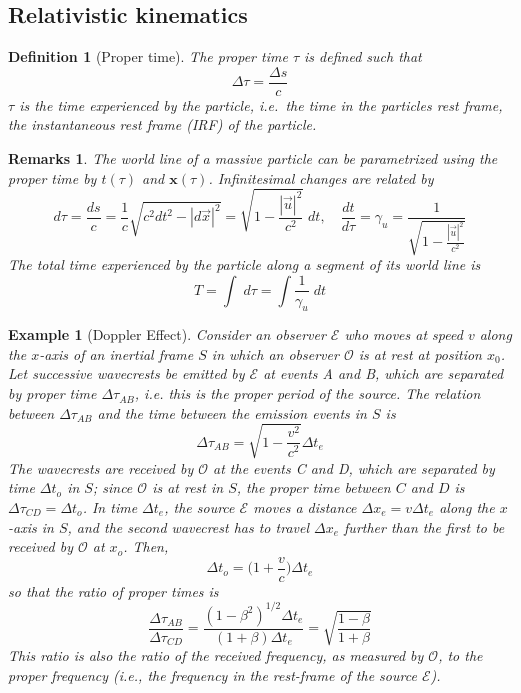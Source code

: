 \documentclass[a4paper]{article}
\newtheorem{eg}{Example}[section]
\newtheorem{remarks}{Remarks}[section]
\theoremstyle{new}
\newtheorem{defi}{Definition}[section]
\begin{document}
\subsection{Relativistic kinematics}
\begin{defi}[Proper time]
  The proper time $\tau$ is defined such that
$$\Delta \tau = \frac{\Delta s}{c}$$
  $\tau$ is the time experienced by the particle, i.e.\ the time in the particles rest frame, the instantaneous rest frame (IRF) of the particle.
\end{defi}
\begin{remarks}
The world line of a massive particle can be parametrized using the proper time by $t(\tau)$ and $\mathbf{x}(\tau)$. Infinitesimal changes are related by
\begin{equation}
d \tau = \frac{d s}{c} = \frac{1}{c}\sqrt{c^2dt^2 - |d \vec{x}|^2} = \sqrt{1 - \frac{|\vec{u}|^2}{c^2}}\;d t,\quad\frac{d t}{d \tau} = \gamma_u= \frac{1}{\sqrt{1 - \frac{|\vec{u}|^2}{c^2}}}\label{propertime}
\end{equation}
The total time experienced by the particle along a segment of its world line is
$$T = \int \;d \tau = \int\frac{1}{\gamma_u}\;d t$$
\end{remarks}
\begin{eg}[Doppler Effect]
Consider an observer $\mathcal{E}$ who moves at speed $v$ along the $x$-axis of an inertial frame $S$ in which an observer $\mathcal{O}$ is at rest at position $x_0$. Let successive wavecrests be emitted by $\mathcal{E}$ at events A and B, which are separated by proper time $\Delta\tau_{AB}$, i.e. this is the proper period of the source. The relation between $\Delta\tau_{AB}$ and the time between the emission events in $S$ is
$$\Delta\tau_{AB}=\sqrt{1-\frac{v^2}{c^2}}\Delta t_e$$
The wavecrests are received by $\mathcal{O}$ at the events C and D, which are separated by time $\Delta t_o$ in $S$; since $\mathcal{O}$ is at rest in $S$, the proper time between $C$ and $D$ is $\Delta\tau_{CD}=\Delta t_o$. In time $\Delta t_e$, the source $\mathcal{E}$ moves a distance $\Delta x_e=v\Delta t_e$ along the $x$-axis in $S$, and the second wavecrest has to travel $\Delta x_e$ further than the first to be received by $\mathcal{O}$ at $x_o$. Then,
$$\Delta t_o=\bigg(1+\frac{v}{c}\bigg)\Delta t_e$$
so that the ratio of proper times is
\begin{equation}
\frac{\Delta\tau_{AB}}{\Delta\tau_{CD}}=\frac{(1-\beta^2)^{1/2}\Delta t_e}{(1+\beta)\Delta t_e}=\sqrt{\frac{1-\beta}{1+\beta}}\label{Doppler}
\end{equation}
This ratio is also the ratio of the received frequency, as measured by $\mathcal{O}$, to the proper frequency (i.e., the frequency in the rest-frame of the source $\mathcal{E}$).
\end{eg}
\end{document}
